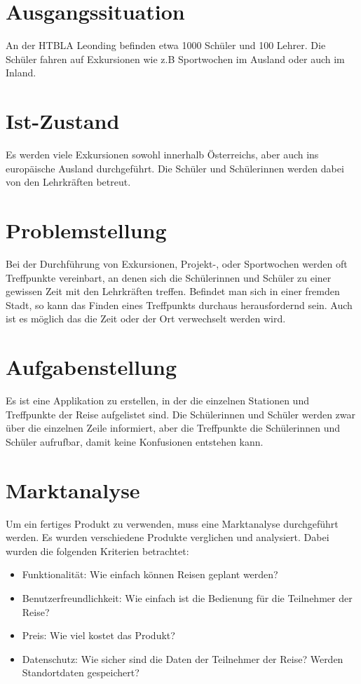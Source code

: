 \section{Ausgangssituation}
An der HTBLA Leonding befinden etwa 1000 Schüler und 100 Lehrer.
Die Schüler fahren auf Exkursionen wie z.B Sportwochen im Ausland oder auch im Inland.

\section{Ist-Zustand}
Es werden viele Exkursionen sowohl innerhalb Österreichs, aber auch ins europäische Ausland durchgeführt. Die Schüler und Schülerinnen werden dabei von den Lehrkräften betreut.

\section{Problemstellung}
Bei der Durchführung von Exkursionen, Projekt-, oder Sportwochen werden oft Treffpunkte vereinbart, an denen sich die Schülerinnen und Schüler zu einer gewissen Zeit mit den Lehrkräften treffen. Befindet man sich in einer fremden Stadt, so kann das Finden eines Treffpunkts durchaus herausfordernd sein. Auch ist es möglich das die Zeit oder der Ort verwechselt werden wird.   

\section{Aufgabenstellung}

Es ist eine Applikation zu erstellen, in der die einzelnen Stationen und Treffpunkte der Reise aufgelistet sind. Die Schülerinnen und Schüler werden zwar über die einzelnen Zeile informiert, aber die Treffpunkte die Schülerinnen und Schüler aufrufbar, damit keine Konfusionen entstehen kann.


\section{Marktanalyse}
Um ein fertiges Produkt zu verwenden, muss eine Marktanalyse durchgeführt werden. Es wurden verschiedene Produkte verglichen und analysiert. Dabei wurden die folgenden Kriterien betrachtet:
\begin{itemize}
    \item Funktionalität: Wie einfach können Reisen geplant werden? 
    \item Benutzerfreundlichkeit: Wie einfach ist die Bedienung für die Teilnehmer der Reise?
    \item Preis: Wie viel kostet das Produkt?
    \item Datenschutz: Wie sicher sind die Daten der Teilnehmer der Reise? Werden Standortdaten gespeichert?
\end{itemize}

